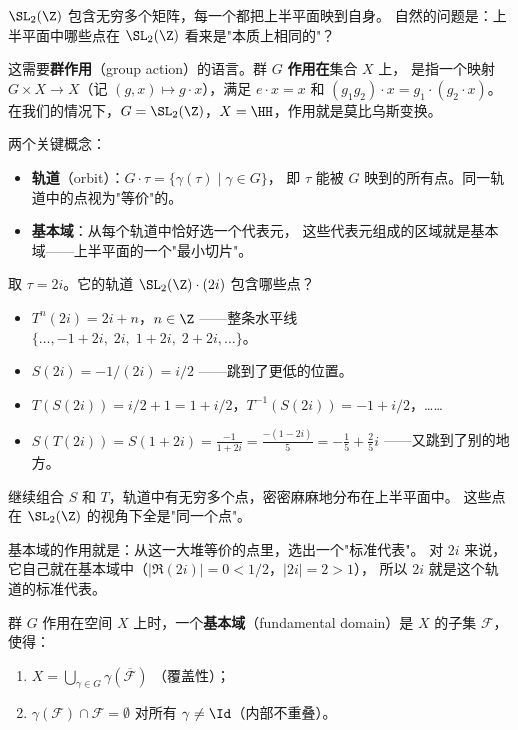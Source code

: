 $\SL_2(\Z)$ 包含无穷多个矩阵，每一个都把上半平面映到自身。
自然的问题是：上半平面中哪些点在 $\SL_2(\Z)$ 看来是"本质上相同的"？

这需要\textbf{群作用}（group action）的语言。群 $G$ \textbf{作用在}集合 $X$ 上，
是指一个映射 $G \times X \to X$（记 $(g, x) \mapsto g \cdot x$），满足
$e \cdot x = x$ 和 $(g_1 g_2) \cdot x = g_1 \cdot (g_2 \cdot x)$。
在我们的情况下，$G = \SL_2(\Z)$，$X = \HH$，作用就是莫比乌斯变换。

两个关键概念：
\begin{itemize}
  \item \textbf{轨道}（orbit）：$G \cdot \tau = \{\gamma(\tau) \mid \gamma \in G\}$，
    即 $\tau$ 能被 $G$ 映到的所有点。同一轨道中的点视为"等价"的。
  \item \textbf{基本域}：从每个轨道中恰好选一个代表元，
    这些代表元组成的区域就是基本域——上半平面的一个"最小切片"。
\end{itemize}

\begin{example}[轨道是什么样的]
\label{ex:orbit-of-2i}
取 $\tau = 2i$。它的轨道 $\SL_2(\Z) \cdot (2i)$ 包含哪些点？
\begin{itemize}
  \item $T^n(2i) = 2i + n$，$n \in \Z$
    ——整条水平线 $\{\ldots, -1+2i, \; 2i, \; 1+2i, \; 2+2i, \ldots\}$。
  \item $S(2i) = -1/(2i) = i/2$
    ——跳到了更低的位置。
  \item $T(S(2i)) = i/2 + 1 = 1 + i/2$，$T^{-1}(S(2i)) = -1 + i/2$，……
  \item $S(T(2i)) = S(1+2i) = \frac{-1}{1+2i} = \frac{-(1-2i)}{5}
    = -\frac{1}{5} + \frac{2}{5}i$
    ——又跳到了别的地方。
\end{itemize}
继续组合 $S$ 和 $T$，轨道中有无穷多个点，密密麻麻地分布在上半平面中。
这些点在 $\SL_2(\Z)$ 的视角下全是"同一个点"。

基本域的作用就是：从这一大堆等价的点里，选出一个"标准代表"。
对 $2i$ 来说，它自己就在基本域中（$|\Re(2i)| = 0 < 1/2$，$|2i| = 2 > 1$），
所以 $2i$ 就是这个轨道的标准代表。
\end{example}

\begin{definition}[基本域]
\label{def:fundamental-domain}
群 $G$ 作用在空间 $X$ 上时，一个\textbf{基本域}（fundamental domain）是
$X$ 的子集 $\mathcal{F}$，使得：
\begin{enumerate}
  \item $X = \bigcup_{\gamma \in G} \gamma(\overline{\mathcal{F}})$
    （覆盖性）；
  \item $\gamma(\mathcal{F}) \cap \mathcal{F} = \emptyset$ 对所有
    $\gamma \neq \Id$（内部不重叠）。
\end{enumerate}
\end{definition}

